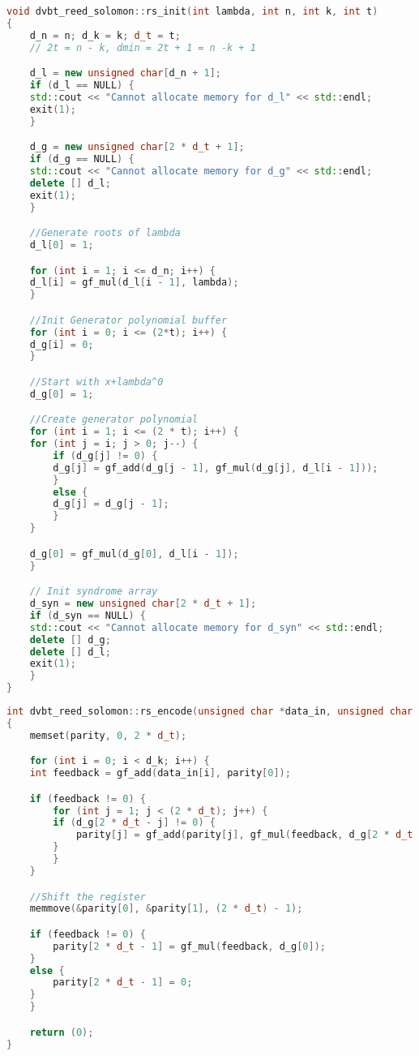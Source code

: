 		\begin{lstlisting}[caption = {RS编码初始化}, label={code:rs_init}, language = C++ ]
void dvbt_reed_solomon::rs_init(int lambda, int n, int k, int t)
{
	d_n = n; d_k = k; d_t = t;
	// 2t = n - k, dmin = 2t + 1 = n -k + 1

	d_l = new unsigned char[d_n + 1];
	if (d_l == NULL) {
	std::cout << "Cannot allocate memory for d_l" << std::endl;
	exit(1);
	}

	d_g = new unsigned char[2 * d_t + 1];
	if (d_g == NULL) {
	std::cout << "Cannot allocate memory for d_g" << std::endl;
	delete [] d_l;
	exit(1);
	}

	//Generate roots of lambda
	d_l[0] = 1;

	for (int i = 1; i <= d_n; i++) {
	d_l[i] = gf_mul(d_l[i - 1], lambda);
	}

	//Init Generator polynomial buffer
	for (int i = 0; i <= (2*t); i++) {
	d_g[i] = 0;
	}

	//Start with x+lambda^0
	d_g[0] = 1;

	//Create generator polynomial
	for (int i = 1; i <= (2 * t); i++) {
	for (int j = i; j > 0; j--) {
		if (d_g[j] != 0) {
		d_g[j] = gf_add(d_g[j - 1], gf_mul(d_g[j], d_l[i - 1]));
		}
		else {
		d_g[j] = d_g[j - 1];
		}
	}

	d_g[0] = gf_mul(d_g[0], d_l[i - 1]);
	}

	// Init syndrome array
	d_syn = new unsigned char[2 * d_t + 1];
	if (d_syn == NULL) {
	std::cout << "Cannot allocate memory for d_syn" << std::endl;
	delete [] d_g;
	delete [] d_l;
	exit(1);
	}
}
		\end{lstlisting}
		\begin{lstlisting}[caption = {RS编码}, label = {code:rs_encode}, language = C++ ]
int dvbt_reed_solomon::rs_encode(unsigned char *data_in, unsigned char *parity)
{
	memset(parity, 0, 2 * d_t);

	for (int i = 0; i < d_k; i++) {
	int feedback = gf_add(data_in[i], parity[0]);

	if (feedback != 0) {
		for (int j = 1; j < (2 * d_t); j++) {
		if (d_g[2 * d_t - j] != 0) {
			parity[j] = gf_add(parity[j], gf_mul(feedback, d_g[2 * d_t - j]));
		}
		}
	}

	//Shift the register
	memmove(&parity[0], &parity[1], (2 * d_t) - 1);

	if (feedback != 0) {
		parity[2 * d_t - 1] = gf_mul(feedback, d_g[0]);
	}
	else {
		parity[2 * d_t - 1] = 0;
	}
	}

	return (0);
}
		\end{lstlisting}
